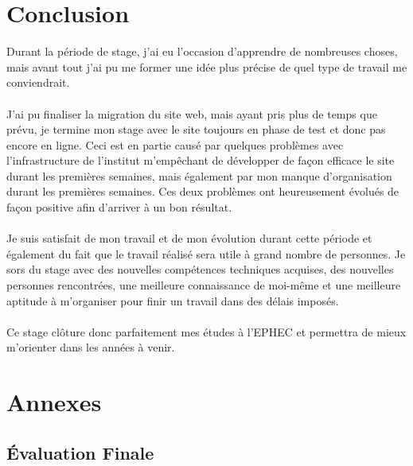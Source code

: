 \documentclass[11pt]{article}
\begin{document}
\newpage

\section{Conclusion}

Durant la période de stage, j'ai eu l'occasion d'apprendre de nombreuses choses, mais avant tout j'ai pu me former une idée plus précise de quel type de travail me conviendrait.\\
\\
J'ai pu finaliser la migration du site web, mais ayant pris plus de temps que prévu, je termine mon stage avec le site toujours en phase de test et donc pas encore en ligne.
Ceci est en partie causé par quelques problèmes avec l'infrastructure de l'institut m'empêchant de développer de façon efficace le site durant les premières semaines, mais également par mon manque d'organisation durant les premières semaines.
Ces deux problèmes ont heureusement évolués de façon positive afin d'arriver à un bon résultat.\\
\\
Je suis satisfait de mon travail et de mon évolution durant cette période et également du fait que le travail réalisé sera utile à grand nombre de personnes.
Je sors du stage avec des nouvelles compétences techniques acquises, des nouvelles personnes rencontrées, une meilleure connaissance de moi-même et une meilleure aptitude à m'organiser pour finir un travail dans des délais imposés.\\
\\
Ce stage clôture donc parfaitement mes études à l'EPHEC et permettra de mieux m'orienter dans les années à venir.

\newpage

\section{Annexes}

\subsection{Évaluation Finale}
\end{document}

